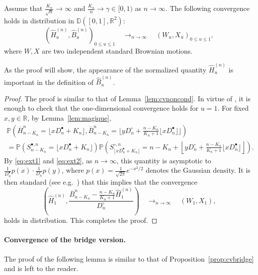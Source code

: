 \documentclass[AHL,XML,longabstracts,Unicode]{cedram}
\newcommand{\R}{\mathbb{R}}
\def\Sbn{S^{\bullet,n}}
\def\Scn{S^{\circ,n}}
\def\Dbn{D^{\bullet}_{n}}
\def\Dcn{D^{\circ}_{n}}
\def\oB{\overline{B}}
\def\hB{\widehat{B}}
\def\oH{\overline{H}}
\def\hH{\widehat{H}}
\renewcommand\Pr[1]{\mathbb{P}\left(#1\right)}
\begin{document}
   \begin{lemma} Assume that $\frac{K_{n}}{\sqrt{n}} \rightarrow   \infty$ and   $\tfrac{K_{n}}{n}  \rightarrow \gamma \in [0,1)$ as $n \rightarrow \infty$.
  The following convergence holds in distribution in $\mathbb{D}([0,1],\R^{2})$:
  \[ \left( \hH^{(n)}_{u} ,  \hB^{(n)}_{u} \right)_{0 \leq u \leq 1}  \quad \mathop{\longrightarrow}_{n \rightarrow \infty} \quad  (W_{u},X_{u})_{0 \leq u \leq 1},\]
 where  $W,X$ are two independent standard Brownian motions.
  \end{lemma}

As the proof will show, the appearance of the normalized quantity $\hH^{(n)}_{u}$ is important in the definition of $\hB^{(n)}_{u}$.

\begin{proof}
The proof is similar to that of Lemma~\ref{lem:cvnoncond}. In virtue of \cite[Theorem 16.14]{Kal02}, it is enough to check that the one-dimensional convergence holds for $u=1$.  For fixed $x,y \in \R$, by Lemma~\ref{lem:magique},
\begin{multline*}
\Pr{\oH^{n}_{  n-K_{n} }= \lfloor x \Dbn+K_{n} \rfloor ,\oB^{n}_{  n-K_{n}}= \lfloor y  \Dcn + \frac{n-K_{n}}{K_{n}+1} \lfloor x \Dbn \rfloor \rfloor} \\
=\Pr{\Sbn_{ n-K_{n} }=  \lfloor x \Dbn +K_{n} \rfloor} \Pr{\Scn_{ \lfloor x \Dbn +K_{n} \rfloor }= n-K_{n}   + \left\lfloor  y  \Dcn + \frac{n-K_{n}}{K_{n}+1} \lfloor x \Dbn \rfloor \right\rfloor}.
\end{multline*}
By \eqref{eq:ext1} and \eqref{eq:ext2}, as $n \rightarrow \infty$, this quantity is asymptotic to $ \tfrac{1}{ \Dbn  }    p (x)  \cdot  \tfrac{1}{\Dcn} p (y)$,
where $p(x)= \tfrac{1}{\sqrt{2\pi}} e^{- {x^{2}}/{2}}$ denotes the Gaussian density.
It is then standard (see e.g.~\cite[Theorem 7.8]{Bil68}) that this implies that the convergence
  \[ \left( \hH^{(n)}_{1} ,  \frac{\oB^{n}_{ n-K_{n} }  - \frac{n-K_{n}}{K_{n}+1} \hH^{(n)}_{1}  }{\Dcn} \right)  \quad \mathop{\longrightarrow}_{n \rightarrow \infty} \quad  (W_{1},X_{1}),\]
  holds in distribution. This completes the proof.
  \end{proof}

\paragraph*{Convergence of the bridge version.} The proof of the following lemma is similar to that of Proposition~\ref{prop:cvbridge} and is left to the reader.
\end{document}

